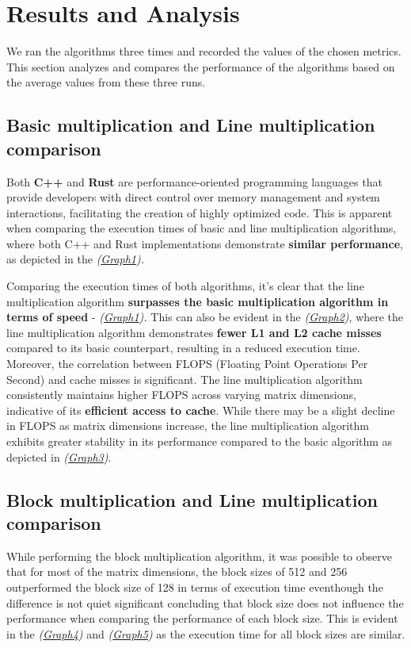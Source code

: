 \section{Results and Analysis}
We ran the algorithms three times 
and recorded the values of the chosen 
metrics. This section analyzes and 
compares the performance of the
algorithms based on the average 
values from these three runs.

\subsection{Basic multiplication and Line multiplication comparison}
Both \textbf{C++} and \textbf{Rust} are performance-oriented programming languages 
that provide developers with direct control over memory 
management and system interactions, facilitating the 
creation of highly optimized code. This is apparent 
when comparing the execution times of basic and line 
multiplication algorithms, where both C++ and Rust 
implementations demonstrate \textbf{similar performance}, as 
depicted in the \textit{(\hyperref[graph:BLG1]{Graph1}).}

Comparing the execution times of both algorithms, 
it's clear that the line multiplication algorithm 
\textbf{surpasses the basic multiplication algorithm in 
terms of speed} - \textit{(\hyperref[graph:BLG1]{Graph1}).} This can also be
evident in the \textit{(\hyperref[graph:BLG2]{Graph2})}, 
where the line multiplication algorithm demonstrates 
\textbf{fewer L1 and L2 cache misses} compared to its basic 
counterpart, resulting in a reduced execution time. 
Moreover, the correlation between FLOPS 
(Floating Point Operations Per Second) and cache misses 
is significant. The line multiplication algorithm 
consistently maintains higher FLOPS across varying 
matrix dimensions, indicative of its \textbf{efficient 
access to cache}. While there may be a 
slight decline in FLOPS as matrix dimensions increase, the 
line multiplication algorithm exhibits 
greater stability in its performance compared to the 
basic algorithm as depicted in \textit{(\hyperref[graph:BLG3]{Graph3})}.

\subsection{Block multiplication and Line multiplication comparison}
While performing the block multiplication algorithm, it was
possible to observe that for most of the matrix dimensions,
the block sizes of 512 and 256 outperformed the block size of 128
in terms of execution time eventhough the difference is
not quiet significant concluding that block size does not influence
the performance when comparing the performance of each block size.
 This is evident in the \textit{(\hyperref[graph:BLG4]{Graph4})} and 
\textit{(\hyperref[graph:BLG8]{Graph5})} as the execution time
for all block sizes are similar.

